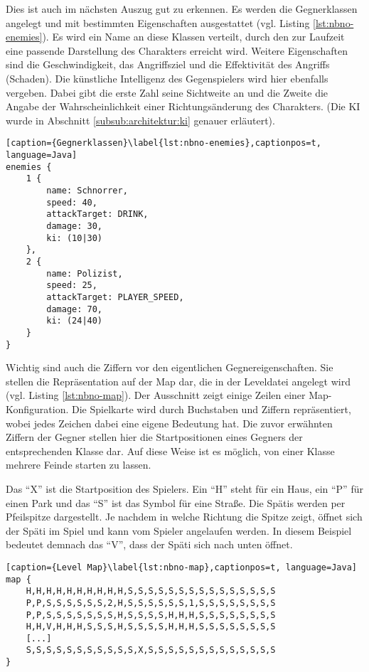 Dies ist auch im nächsten Auszug gut zu erkennen.
Es werden die Gegnerklassen angelegt und mit bestimmten Eigenschaften ausgestattet (vgl. Listing \ref{lst:nbno-enemies}).
Es wird ein Name an diese Klassen verteilt, durch den zur Laufzeit eine passende Darstellung des Charakters erreicht wird.
Weitere Eigenschaften sind die Geschwindigkeit, das Angriffsziel und die Effektivität des Angriffs (Schaden).
Die künstliche Intelligenz des Gegenspielers wird hier ebenfalls vergeben.
Dabei gibt die erste Zahl seine Sichtweite an und die Zweite die Angabe der Wahrscheinlichkeit einer Richtungsänderung des Charakters. (Die KI wurde in Abschnitt \ref{subsub:architektur:ki} genauer erläutert).

\begin{lstlisting}[caption={Gegnerklassen}\label{lst:nbno-enemies},captionpos=t, language=Java]
enemies {
    1 {
        name: Schnorrer,
        speed: 40,
        attackTarget: DRINK,
        damage: 30,
        ki: (10|30)
    },
    2 {
        name: Polizist,
        speed: 25,
        attackTarget: PLAYER_SPEED,
        damage: 70,
        ki: (24|40)
    }
}
\end{lstlisting}

Wichtig sind auch die Ziffern vor den eigentlichen Gegnereigenschaften. Sie stellen die Repräsentation auf der Map dar, die in der Leveldatei angelegt wird (vgl. Listing \ref{lst:nbno-map}). Der Ausschnitt zeigt einige Zeilen einer Map-Konfiguration. Die Spielkarte wird durch Buchstaben und Ziffern repräsentiert, wobei jedes Zeichen dabei eine eigene Bedeutung hat. Die zuvor erwähnten Ziffern der Gegner stellen hier die Startpositionen eines Gegners der entsprechenden Klasse dar. Auf diese Weise ist es möglich, von einer Klasse mehrere Feinde starten zu lassen.

Das ``X'' ist die Startposition des Spielers. Ein ``H'' steht für ein Haus, ein ``P'' für einen Park und das ``S'' ist das Symbol für eine Straße. Die Spätis werden per Pfeilspitze dargestellt. Je nachdem in welche Richtung die Spitze zeigt, öffnet sich der Späti im Spiel und kann vom Spieler angelaufen werden. In diesem Beispiel bedeutet demnach das ``V'', dass der Späti sich nach unten öffnet.

\begin{lstlisting}[caption={Level Map}\label{lst:nbno-map},captionpos=t, language=Java] 
map {
    H,H,H,H,H,H,H,H,H,H,S,S,S,S,S,S,S,S,S,S,S,S,S,S,S
    P,P,S,S,S,S,S,S,2,H,S,S,S,S,S,S,1,S,S,S,S,S,S,S,S
    P,P,S,S,S,S,S,S,S,H,S,S,S,S,H,H,H,S,S,S,S,S,S,S,S
    H,H,V,H,H,H,S,S,S,H,S,S,S,S,H,H,H,S,S,S,S,S,S,S,S
	[...]
    S,S,S,S,S,S,S,S,S,S,S,X,S,S,S,S,S,S,S,S,S,S,S,S,S
}
\end{lstlisting}

